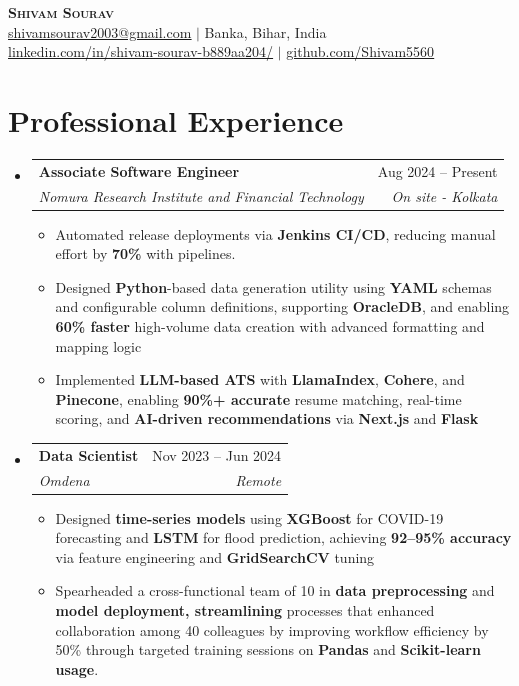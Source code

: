 \documentclass[letterpaper,11pt]{article}
\makeatletter
\newcommand{\resumeItem}[1]{
  \item \small{
    {#1 \vspace{-2pt}}
  }
}
\newcommand{\resumeSubheading}[4]{
  \vspace{-2pt}\item
    \begin{tabular*}{0.97\textwidth}[t]{l@{\extracolsep{\fill}}r}
      \textbf{#1} & #2 \\
      \textit{\small#3} & \textit{\small#4} \\
    \end{tabular*}\vspace{-5pt}
}
\newcommand{\resumeSubHeadingListStart}{\begin{itemize}[leftmargin=0.15in, label={}]}
\newcommand{\resumeSubHeadingListEnd}{\end{itemize}}
\newcommand{\resumeItemListStart}{\begin{itemize}}
\newcommand{\resumeItemListEnd}{\end{itemize}\vspace{-5pt}}
\makeatother
\begin{document}
\begin{center}
    \textbf{\Huge \scshape Shivam Sourav} \\ \vspace{1pt}
     \href{mailto:shivamsourav2003@gmail.com}{\underline{shivamsourav2003@gmail.com}} $|$ Banka, Bihar, India \\ \href{https://www.linkedin.com/in/shivam-sourav-b889aa204/}{\underline{linkedin.com/in/shivam-sourav-b889aa204/}} $|$
    \href{https://github.com/Shivam5560}{\underline{github.com/Shivam5560}}
\end{center}


\section{Professional Experience}
  \resumeSubHeadingListStart
    \resumeSubheading
      {Associate Software Engineer}{Aug 2024 -- Present}
      {Nomura Research Institute and Financial Technology}{On site - Kolkata}
      \resumeItemListStart
    \resumeItem{Automated release deployments via \textbf{Jenkins CI/CD}, reducing manual effort by \textbf{70\%} with pipelines.}\resumeItem{Designed \textbf{Python}-based data generation utility using \textbf{YAML} schemas and configurable column definitions, supporting \textbf{OracleDB}, and enabling \textbf{60\% faster} high-volume data creation with advanced formatting and mapping logic}\resumeItem{Implemented \textbf{LLM-based ATS} with \textbf{LlamaIndex}, \textbf{Cohere}, and \textbf{Pinecone}, enabling \textbf{90\%+ accurate} resume matching, real-time scoring, and \textbf{AI-driven recommendations} via \textbf{Next.js} and \textbf{Flask}}

\resumeItemListEnd
    \resumeSubheading
  {Data Scientist}{Nov 2023 -- Jun 2024}
  {Omdena}{Remote}
\resumeItemListStart
  \resumeItem{Designed \textbf{time-series models} using \textbf{XGBoost} for COVID-19 forecasting and \textbf{LSTM} for flood prediction, achieving \textbf{92–95\% accuracy} via feature engineering and \textbf{GridSearchCV} tuning}

  \resumeItem{Spearheaded a cross-functional team of 10 in \textbf{data preprocessing} and \textbf{model deployment, streamlining} processes that enhanced collaboration among 40 colleagues by improving workflow efficiency by 50\% through targeted training sessions on \textbf{Pandas} and \textbf{Scikit-learn usage}.}
\resumeItemListEnd
  \resumeSubHeadingListEnd
\end{document}
